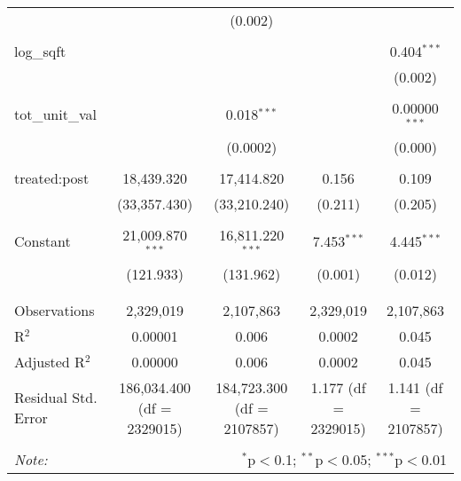 \begin{table}[H]
{\begin{tabular}{@{\extracolsep{5pt}}lcccc}
   &  & (0.002) &  &  \\  

   & & & & \\  

  log\_sqft &  &  &  & 0.404$^{***}$ \\  

   &  &  &  & (0.002) \\  

   & & & & \\  

  tot\_unit\_val &  & 0.018$^{***}$ &  & 0.00000$^{***}$ \\  

   &  & (0.0002) &  & (0.000) \\  

   & & & & \\  

  treated:post & 18,439.320 & 17,414.820 & 0.156 & 0.109 \\  

   & (33,357.430) & (33,210.240) & (0.211) & (0.205) \\  

   & & & & \\  

  Constant & 21,009.870$^{***}$ & 16,811.220$^{***}$ & 7.453$^{***}$ & 4.445$^{***}$ \\  

   & (121.933) & (131.962) & (0.001) & (0.012) \\  

   & & & & \\  

 \hline \\[-1.8ex]  

 Observations & 2,329,019 & 2,107,863 & 2,329,019 & 2,107,863 \\  

 R$^{2}$ & 0.00001 & 0.006 & 0.0002 & 0.045 \\  

 Adjusted R$^{2}$ & 0.00000 & 0.006 & 0.0002 & 0.045 \\  

 Residual Std. Error & 186,034.400 (df = 2329015) & 184,723.300 (df = 2107857) & 1.177 (df = 2329015) & 1.141 (df = 2107857) \\  

 \hline  

 \hline \\[-1.8ex]  

 \textit{Note:}  & \multicolumn{4}{r}{$^{*}$p$<$0.1; $^{**}$p$<$0.05; $^{***}$p$<$0.01} \\  

 \end{tabular}}  

 \end{table}  

